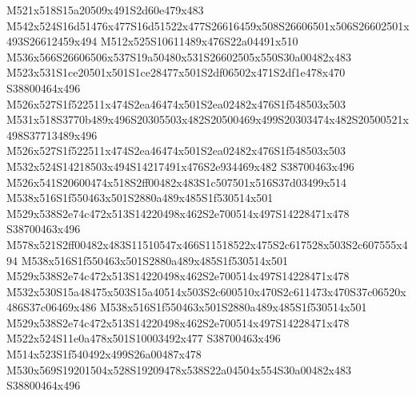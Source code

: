 \documentclass{article}
\begin{document}
\begin{multicols}{2}






M521x518S15a20509x491S2d60e479x483 M542x524S16d51476x477S16d51522x477S26616459x508S26606501x506S26602501x493S26612459x494 M512x525S10611489x476S22a04491x510 M536x566S26606506x537S19a50480x531S26602505x550S30a00482x483 M523x531S1ce20501x501S1ce28477x501S2df06502x471S2df1e478x470 S38800464x496 M526x527S1f522511x474S2ea46474x501S2ea02482x476S1f548503x503 M531x518S3770b489x496S20305503x482S20500469x499S20303474x482S20500521x498S37713489x496 M526x527S1f522511x474S2ea46474x501S2ea02482x476S1f548503x503 M532x524S14218503x494S14217491x476S2e934469x482 S38700463x496 M526x541S20600474x518S2ff00482x483S1c507501x516S37d03499x514 M538x516S1f550463x501S2880a489x485S1f530514x501 M529x538S2e74c472x513S14220498x462S2e700514x497S14228471x478 S38700463x496 M578x521S2ff00482x483S11510547x466S11518522x475S2c617528x503S2c607555x494 M538x516S1f550463x501S2880a489x485S1f530514x501 M529x538S2e74c472x513S14220498x462S2e700514x497S14228471x478 M532x530S15a48475x503S15a40514x503S2c600510x470S2c611473x470S37c06520x486S37c06469x486 M538x516S1f550463x501S2880a489x485S1f530514x501 M529x538S2e74c472x513S14220498x462S2e700514x497S14228471x478 M522x524S11e0a478x501S10003492x477 S38700463x496 M514x523S1f540492x499S26a00487x478 M530x569S19201504x528S19209478x538S22a04504x554S30a00482x483 S38800464x496




\end{multicols}
\end{document}
